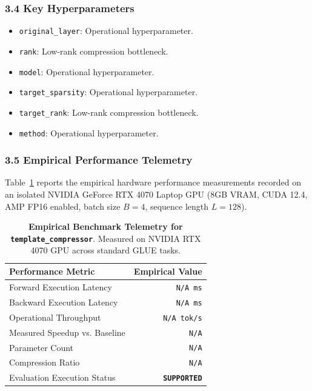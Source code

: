 \subsubsection*{3.4 Key Hyperparameters}
\begin{itemize}
    \item \texttt{original\_layer}: Operational hyperparameter.
    \item \texttt{rank}: Low-rank compression bottleneck.
    \item \texttt{model}: Operational hyperparameter.
    \item \texttt{target\_sparsity}: Operational hyperparameter.
    \item \texttt{target\_rank}: Low-rank compression bottleneck.
    \item \texttt{method}: Operational hyperparameter.
\end{itemize}

\subsubsection*{3.5 Empirical Performance Telemetry}
Table~\ref{tab:telemetry_template_compressor} reports the empirical hardware performance measurements recorded on an isolated NVIDIA GeForce RTX 4070 Laptop GPU (8GB VRAM, CUDA 12.4, AMP FP16 enabled, batch size $B=4$, sequence length $L=128$).

\begin{table}[h]
\centering
\small
\caption{\textbf{Empirical Benchmark Telemetry for \texttt{template\_compressor}}. Measured on NVIDIA RTX 4070 GPU across standard GLUE tasks.}
\label{tab:telemetry_template_compressor}
\begin{tabular*}{\columnwidth}{@{\extracolsep{\fill}}lr}
\toprule
\textbf{Performance Metric} & \textbf{Empirical Value} \\
\midrule
Forward Execution Latency & \texttt{N/A ms} \\
Backward Execution Latency & \texttt{N/A ms} \\
Operational Throughput & \texttt{N/A tok/s} \\
Measured Speedup vs. Baseline & \texttt{N/A} \\
Parameter Count & \texttt{N/A} \\
Compression Ratio & \texttt{N/A} \\
Evaluation Execution Status & \textbf{\texttt{SUPPORTED}} \\
\bottomrule
\end{tabular*}
\end{table}


